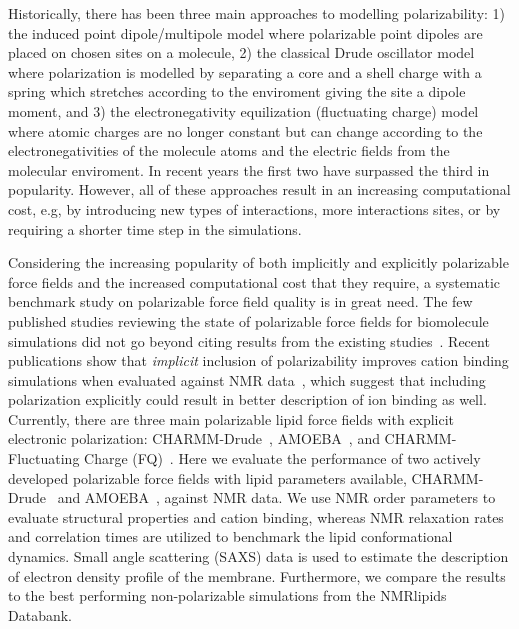 \documentclass[journal=jacsat,manuscript=article,layout=singlecolumn]{achemso}
\begin{document}
Historically, there has been three main approaches to modelling polarizability: 1) the induced point dipole/multipole model where polarizable point dipoles are placed on chosen sites on a molecule, 2) the classical Drude oscillator model where polarization is modelled by separating a core and a shell charge with a spring which stretches according to the enviroment giving the site a dipole moment, and 3) the electronegativity equilization (fluctuating charge) model where atomic charges are no longer constant but can change according to the electronegativities of the molecule atoms and the electric fields from the molecular enviroment. In recent years the first two have surpassed the third in popularity. However, all of these approaches result in an increasing computational cost, e.g, by introducing new types of interactions, more interactions sites, or by requiring a shorter time step in the simulations.





Considering the increasing popularity of both implicitly and explicitly polarizable force fields and the increased computational cost that they require, a systematic benchmark study on polarizable force field quality is in great need. The few published studies reviewing the state of polarizable force fields for biomolecule simulations did not go beyond citing results from the existing studies~\cite{inakollu2020polarisable,jing2019polarizable,baker2015polarizable}. Recent publications show that \textit{implicit} inclusion of polarizability improves cation binding simulations when evaluated against NMR data~\cite{Melcr:2018a, melcr2019improved}, which suggest that including polarization explicitly could result in better description of ion binding as well. 
Currently, there are three main polarizable lipid force fields with explicit electronic polarization: CHARMM-Drude~\cite{li2017drude}, AMOEBA~\cite{chu2018anionicpolarizable,chu2018polarizable}, and CHARMM-Fluctuating Charge (FQ)~\cite{lucas2012charge}. 
Here we evaluate the performance of two actively developed polarizable force fields with lipid parameters available, CHARMM-Drude~\cite{li2017drude} and AMOEBA~\cite{chu2018anionicpolarizable,chu2018polarizable}, against NMR data. We use NMR order parameters to evaluate  structural properties and cation binding, whereas NMR relaxation rates and correlation times are utilized to benchmark the lipid conformational dynamics. Small angle scattering (SAXS) data is used to estimate the description of electron density profile of the membrane. Furthermore, we compare the results to the best performing non-polarizable simulations from the NMRlipids Databank\cite{Databank}.
\end{document}
